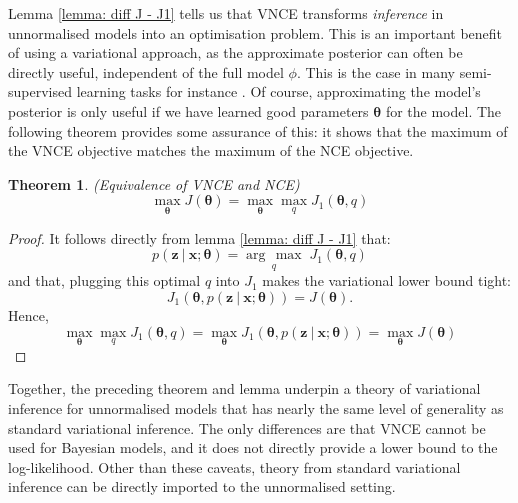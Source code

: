\documentclass[11pt, oneside]{article}
\newcommand{\thetab}{{\boldsymbol{\theta}}}
\newcommand{\pnn}{\phi}
\newcommand{\x}{{\mathbf x}}
\newcommand{\z}{{\mathbf z}}
\newcommand\given[1][]{\:#1\vert\:}
\newtheorem{theorem}{Theorem}
\theoremstyle{definition}
\newcommand{\argmax}[1]{\underset{#1}{\operatorname{arg}\,\operatorname{max}}\;}
\begin{document}
Lemma \ref{lemma: diff J - J1} tells us that VNCE transforms \emph{inference} in unnormalised models into an optimisation problem. This is an important benefit of using a variational approach, as the approximate posterior can often be directly useful, independent of the full model $\pnn$. This is the case in many semi-supervised learning tasks for instance \citep{kingma2014semi}. Of course, approximating the model's posterior is only useful if we have learned good parameters $\thetab$ for the model. The following theorem provides some assurance of this: it shows that the maximum of the VNCE objective matches the maximum of the NCE objective.
\begin{theorem}{(Equivalence of VNCE and NCE)}
\label{theorem: equivalece of vnce and nce}
\begin{equation}
    \max_{\thetab} J(\thetab) = \max_{\thetab} \max_{q} J_1(\thetab, q)
\end{equation}
\end{theorem}
\begin{proof}
It follows directly from lemma \ref{lemma: diff J - J1} that:
\begin{equation}
    p(\z \given \x ; \thetab) = \argmax{q} J_1(\thetab, q)
\end{equation}
and that, plugging this optimal $q$ into $J_1$ makes the variational lower bound tight:
\begin{equation}
    J_1(\thetab, p(\z \given \x ;\thetab)) = J(\thetab).
\end{equation}
Hence,
\begin{equation}
    \max_{\thetab} \max_{q} J_1(\thetab, q) = \max_{\thetab} J_1(\thetab, p(\z \given \x ;\thetab)) =  \max_{\thetab} J(\thetab)
\end{equation}
\end{proof}
Together, the preceding theorem and lemma underpin a theory of variational inference for unnormalised models that has nearly the same level of generality as standard variational inference. The only differences are that VNCE cannot be used for Bayesian models, and it does not directly provide a lower bound to the log-likelihood. Other than these caveats, theory from standard variational inference can be directly imported to the unnormalised setting.
\end{document}
